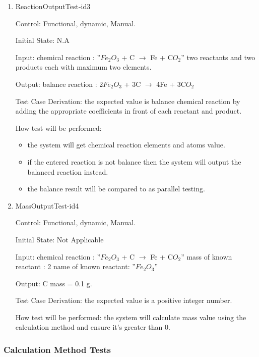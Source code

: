 \documentclass[12pt, titlepage]{article}
\begin{document}
\begin{enumerate}

\item{ReactionOutputTest-id3\\}

Control: Functional, dynamic, Manual.
					
Initial State: N.A
					
Input: 
chemical reaction : ”$Fe_2$$O_3$ + C $\rightarrow$ Fe + C$O_2$”
two reactants and two products each with maximum two elements.
	
Output: balance reaction : 2$Fe_2$$O_3$ + 3C $\rightarrow$ 4Fe + 3C$O_2$

Test Case Derivation: the expected value is balance chemical reaction by adding the appropriate coefficients in front of each reactant and product.

How test will be performed: 
\begin{itemize}
\item the system will get chemical reaction elements and atoms value. 
\item if the entered reaction is not balance then the system will output the balanced reaction instead. 
\item the balance result will be compared to \cite{OnlineBalancer} as parallel testing.
\end{itemize}


\item{MassOutputTest-id4\\}

Control: Functional, dynamic, Manual.
					
Initial State: Not Applicable
					
Input:
\newline
chemical reaction : ”$Fe_2$$O_3$ + C $\rightarrow$ Fe + C$O_2$”
\newline
mass of known reactant : 2
\newline
name of known reactant: ”$Fe_2$$O_3$”
				
Output: C mass = 0.1 g. 

Test Case Derivation: the expected value is a positive integer number. 
					
How test will be performed: 
the system will calculate mass value using the calculation method and ensure it's greater than 0.
 


\end{enumerate}	

\subsubsection{Calculation Method Tests}
\end{document}
